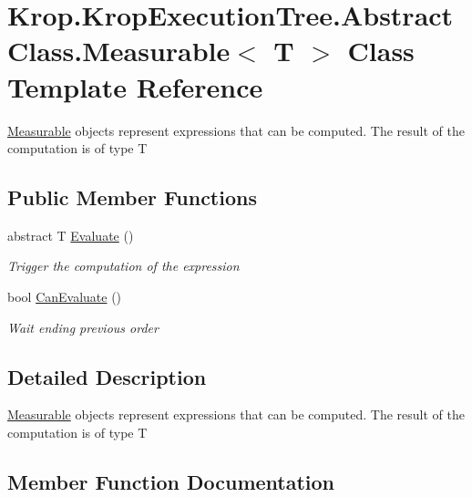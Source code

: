 \hypertarget{class_krop_1_1_krop_execution_tree_1_1_abstract_class_1_1_measurable}{}\section{Krop.\+Krop\+Execution\+Tree.\+Abstract\+Class.\+Measurable$<$ T $>$ Class Template Reference}
\label{class_krop_1_1_krop_execution_tree_1_1_abstract_class_1_1_measurable}


\mbox{\hyperlink{class_krop_1_1_krop_execution_tree_1_1_abstract_class_1_1_measurable}{Measurable}} objects represent expressions that can be computed. The result of the computation is of type T  


\subsection*{Public Member Functions}
\begin{DoxyCompactItemize}
\item 
abstract T \mbox{\hyperlink{class_krop_1_1_krop_execution_tree_1_1_abstract_class_1_1_measurable_afe91c739e2db11c8f316b07e8f55f7bb}{Evaluate}} ()
\begin{DoxyCompactList}\small\item\em Trigger the computation of the expression \end{DoxyCompactList}\item 
bool \mbox{\hyperlink{class_krop_1_1_krop_execution_tree_1_1_abstract_class_1_1_measurable_af2cf52c10abba40adf7a4abd355d9c04}{Can\+Evaluate}} ()
\begin{DoxyCompactList}\small\item\em Wait ending previous order \end{DoxyCompactList}\end{DoxyCompactItemize}


\subsection{Detailed Description}
\mbox{\hyperlink{class_krop_1_1_krop_execution_tree_1_1_abstract_class_1_1_measurable}{Measurable}} objects represent expressions that can be computed. The result of the computation is of type T 



\subsection{Member Function Documentation}
\mbox{\label{class_krop_1_1_krop_execution_tree_1_1_abstract_class_1_1_measurable_af2cf52c10abba40adf7a4abd355d9c04}} 

